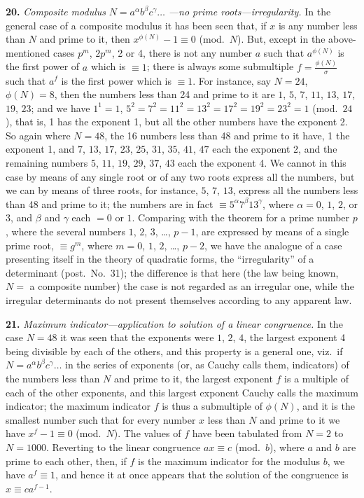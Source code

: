 \documentclass[11pt,a4paper]{article}
\begin{document}
\textbf{20.}\quad
\textit{Composite modulus} $N = a^{\alpha} b^{\beta} c^{\gamma} \ldots$ \textit{---no prime roots---irregularity.} In the general case of a composite modulus it has been seen that, if $x$ is any number less than $N$ and prime to it, then $x^{\phi(N)} - 1 \equiv 0$ (mod.\ $N$). But, except in the above-mentioned cases $p^{m}$, $2p^{m}$, 2 or 4, there is not any number $a$ such that $a^{\phi(N)}$ is the first power of $a$ which is $\equiv 1$; there is always some submultiple $f = \frac{\phi(N)}{\sigma}$ such that $a^{f}$ is the first power which is $\equiv 1$. For instance, say $N = 24$, $\phi(N) = 8$, then the numbers less than 24 and prime to it are $1$, $5$, $7$, $11$, $13$, $17$, $19$, $23$; and we have $1^{1} = 1$, $5^{2} = 7^{2} = 11^{2} = 13^{2} = 17^{2} = 19^{2} = 23^{2} = 1$ (mod.\ $24$), that is, 1 has the exponent 1, but all the other numbers have the exponent 2. So again where $N = 48$, the 16 numbers less than 48 and prime to it have, 1 the exponent 1, and $7$, $13$, $17$, $23$, $25$, $31$, $35$, $41$, $47$ each the exponent 2, and the remaining numbers $5$, $11$, $19$, $29$, $37$, $43$ each the exponent 4. We cannot in this case by means of any single root or of any two roots express all the numbers, but we can by means of three roots, for instance, $5$, $7$, $13$, express all the numbers less than 48 and prime to it; the numbers are in fact $\equiv 5^{\alpha} 7^{\beta} 13^{\gamma}$, where $\alpha = 0$, $1$, $2$, or $3$, and $\beta$ and $\gamma$ each $= 0$ or $1$. Comparing with the theorem for a prime number $p$, where the several numbers $1$, $2$, $3$, \ldots, $p - 1$, are expressed by means of a single prime root, $\equiv g^{m}$, where $m = 0$, $1$, $2$, \ldots, $p - 2$, we have the analogue of a case presenting itself in the theory of quadratic forms, the ``irregularity'' of a determinant (post.\ No.~31); the difference is that here (the law being known, $N = $ a composite number) the case is not regarded as an irregular one, while the irregular determinants do not present themselves according to any apparent law.

\textbf{21.}\quad
\textit{Maximum indicator---application to solution of a linear congruence.} In the case $N = 48$ it was seen that the exponents were $1$, $2$, $4$, the largest exponent 4 being divisible by each of the others, and this property is a general one, viz.\ if $N = a^{\alpha} b^{\beta} c^{\gamma} \ldots$ in the series of exponents (or, as Cauchy calls them, indicators) of the numbers less than $N$ and prime to it, the largest exponent $f$ is a multiple of each of the other exponents, and this largest exponent Cauchy calls the maximum indicator; the maximum indicator $f$ is thus a submultiple of $\phi(N)$, and it is the smallest number such that for every number $x$ less than $N$ and prime to it we have $x^{f} - 1 \equiv 0$ (mod.\ $N$). The values of $f$ have been tabulated from $N = 2$ to $N = 1000$. Reverting to the linear congruence $ax \equiv c$ (mod.\ $b$), where $a$ and $b$ are prime to each other, then, if $f$ is the maximum indicator for the modulus $b$, we have $a^{f} \equiv 1$, and hence it at once appears that the solution of the congruence is $x \equiv ca^{f-1}$.
\end{document}
